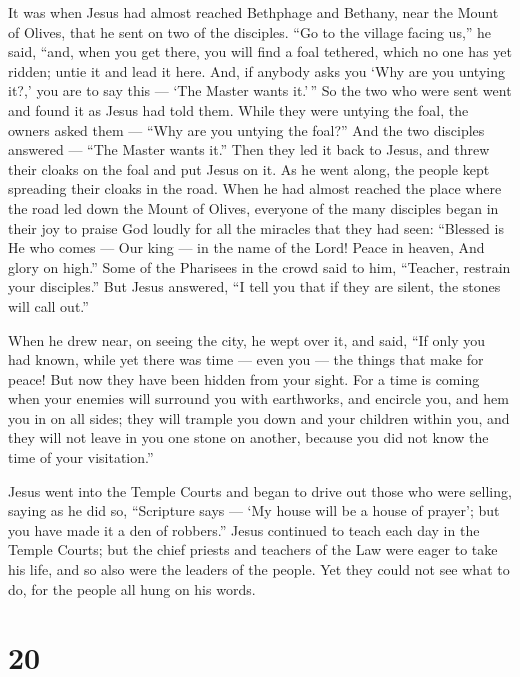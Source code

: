  It was when Jesus had almost reached Bethphage and
Bethany, near the Mount of Olives, that he sent on two of the disciples.
 ``Go to the village facing us,'' he said, ``and, when you
get there, you will find a foal tethered, which no one has yet ridden;
untie it and lead it here.  And, if anybody asks you `Why
are you untying it?,' you are to say this --- `The Master wants it.'\,''
 So the two who were sent went and found it as Jesus had
told them.  While they were untying the foal, the owners
asked them --- ``Why are you untying the foal?''  And the
two disciples answered --- ``The Master wants it.''  Then
they led it back to Jesus, and threw their cloaks on the foal and put
Jesus on it.  As he went along, the people kept spreading
their cloaks in the road.  When he had almost reached the
place where the road led down the Mount of Olives, everyone of the many
disciples began in their joy to praise God loudly for all the miracles
that they had seen:  ``Blessed is He who comes --- Our king
--- in the name of the Lord! Peace in heaven, And glory on high.''
 Some of the Pharisees in the crowd said to him, ``Teacher,
restrain your disciples.''  But Jesus answered, ``I tell
you that if they are silent, the stones will call out.''

 When he drew near, on seeing the city, he wept over it,
and said,  ``If only you had known, while yet there was
time --- even you --- the things that make for peace! But now they have
been hidden from your sight.  For a time is coming when
your enemies will surround you with earthworks, and encircle you, and
hem you in on all sides;  they will trample you down and
your children within you, and they will not leave in you one stone on
another, because you did not know the time of your visitation.''

 Jesus went into the Temple Courts and began to drive out
those who were selling,  saying as he did so, ``Scripture
says --- `My house will be a house of prayer'; but you have made it a
den of robbers.''  Jesus continued to teach each day in the
Temple Courts; but the chief priests and teachers of the Law were eager
to take his life, and so also were the leaders of the people.
 Yet they could not see what to do, for the people all hung
on his words.

\hypertarget{section-18}{%
\section{20}\label{section-18}}

